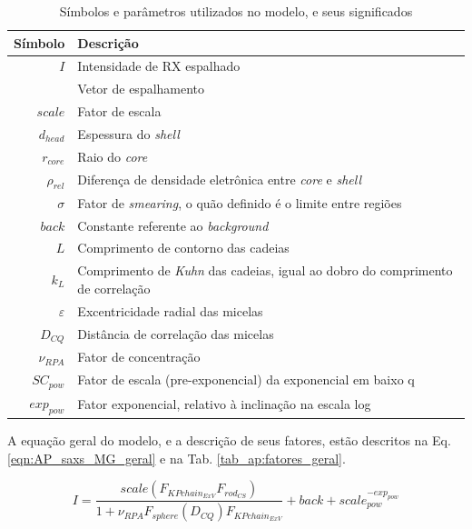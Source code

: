 \begin{apendicesenv}
\begin{table}
    \IBGEtab%
    {\caption{Símbolos e parâmetros utilizados no modelo, e seus significados}
     \label{tab_ap:simbolos} }%
    {\begin{tabular}{r p{8cm}}
    	\toprule
     Símbolo 			    & Descrição        						\\    \midrule
     \(I\)					& Intensidade de RX espalhado			\\
     \q					    & Vetor de espalhamento					\\    \midrule
     \(scale\)				& Fator de escala						\\
     \(d_{head}\)			& Espessura do \emph{shell}				\\
     \(r_{core}\)			& Raio do \emph{core}					\\
     \(\rho_{rel}\)		    & Diferença de densidade eletrônica entre \emph{core} e \emph{shell} \\
     \(\sigma\)			    & Fator de \emph{smearing}, o quão definido é o limite entre regiões \\
     \(back\)				& Constante referente ao \emph{background} \\
     \(L\)					& Comprimento de contorno das cadeias 	\\
     \(k_L\)				& Comprimento de \emph{Kuhn} das cadeias, igual ao dobro do comprimento de correlação \\ %
     \(\varepsilon\)		& Excentricidade radial das micelas		\\
     \(D_{CQ}\)			    & Distância de correlação das micelas 	\\
     \(\nu_{RPA}\)			& Fator de concentração					\\ \midrule
     \(SC_{pow}\)			& Fator de escala (pre-exponencial) da exponencial em baixo q\\
     \(exp_{pow}\)			& Fator exponencial, relativo à inclinação na escala log\\ \bottomrule
    \end{tabular}}%
    {}%
\end{table}

A equação geral do modelo, e a descrição de seus fatores, estão descritos na Eq.\ref{eqn:AP_saxs_MG_geral} e na Tab. \ref{tab_ap:fatores_geral}.

\begin{equation}
I = \frac{scale\left(F_{KPchain_{ExV}}F_{rod_{CS}}\right)}{1 + \nu_{RPA} F_{sphere}\left( D_{CQ}\right) F_{KPchain_{ExV}}} + back + scale_{pow}^{-exp_{pow}}
\label{eqn:AP_saxs_MG_geral}
\end{equation}


\end{apendicesenv}
